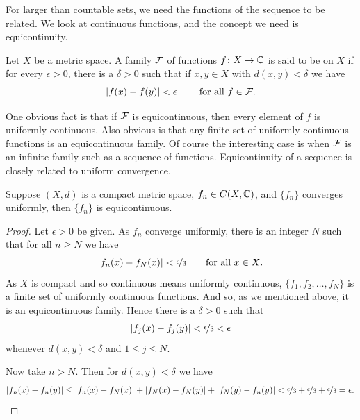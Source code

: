 For larger than countable sets,
we need the functions of the sequence to be related.  We look at
continuous functions, and the concept we need is equicontinuity.

\begin{defn}
Let $X$ be a metric space.
A family ${\mathcal{F}}$ of functions $f \colon X \to {\mathbb{C}}$ is said to be
\emph{} on $X$ if for every $\epsilon > 0$, there is a $\delta > 0$
such that if $x, y \in X$ with $d(x,y) < \delta$ we have
\begin{equation*}
\lvert {f(x)-f(y)} \rvert < \epsilon \qquad \text{ for all $f \in {\mathcal{F}}$} .
\end{equation*}
\end{defn}

One obvious fact is that if ${\mathcal{F}}$ is equicontinuous, then every element of
$f$ is uniformly continuous.  Also obvious is that any finite set of
uniformly continuous functions is an equicontinuous family.  Of course the
interesting case is when ${\mathcal{F}}$ is an infinite family such as a sequence of
functions.  Equicontinuity of a sequence
is closely related to uniform convergence.

\begin{prop}
Suppose $(X,d)$ is a compact metric space,
$f_n \in C(X,{\mathbb{C}})$, and $\{ f_n \}$
converges uniformly, then $\{ f_n \}$ is equicontinuous.
\end{prop}

\begin{proof}
Let $\epsilon > 0$ be given.
As $f_n$ converge uniformly, there is an integer $N$ such that for
all $n \geq N$ we have
\begin{equation*}
\lvert {f_n(x)-f_N(x)} \rvert < \nicefrac{\epsilon}{3} \qquad \text{for all $x \in X$}.
\end{equation*}
As $X$ is compact and so continuous means
uniformly continuous,
$\{ f_1,f_2,\ldots,f_N \}$ is a finite set of uniformly continuous
functions.  And so, as we mentioned above, it is an equicontinuous family.  Hence
there is a $\delta > 0$ such that
\begin{equation*}
\lvert {f_j(x)-f_j(y)} \rvert < \nicefrac{\epsilon}{3} < \epsilon
\end{equation*}
whenever $d(x,y) < \delta$ and $1 \leq j \leq N$.

Now take $n > N$.  Then for $d(x,y) < \delta$ we have
\begin{equation*}
\lvert {f_n(x)-f_n(y)} \rvert
\leq
\lvert {f_n(x)-f_N(x)} \rvert
+
\lvert {f_N(x)-f_N(y)} \rvert
+
\lvert {f_N(y)-f_n(y)} \rvert
<
\nicefrac{\epsilon}{3}
+
\nicefrac{\epsilon}{3}
+
\nicefrac{\epsilon}{3}
=\epsilon . \qedhere
\end{equation*}
\end{proof}

